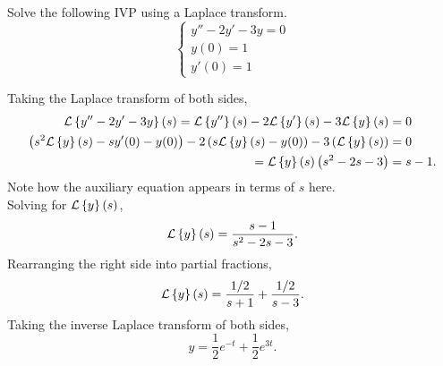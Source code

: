 \begin{example}
	Solve the following IVP using a Laplace transform.
	\begin{equation*}
		\begin{cases}
			y'' - 2y' - 3y = 0 \\
			y(0) = 1 \\
			y'(0) = 1
		\end{cases}
	\end{equation*}
\end{example}
\noindent
Taking the Laplace transform of both sides,
\begin{align*}
	\mathcal{L}\left\{ y'' - 2y' - 3y \right\}\left(s\right) = \mathcal{L}\left\{ y'' \right\}\left(s\right) - 2\mathcal{L}\left\{ y' \right\}\left(s\right) - 3\mathcal{L}\left\{ y \right\}\left(s\right) &= 0 \\
	\left(s^2\mathcal{L}\left\{ y \right\}\left(s\right) - sy'(0) - y(0)\right) - 2\left(s\mathcal{L}\left\{ y \right\}\left(s\right) - y(0)\right) - 3\left(\mathcal{L}\left\{ y \right\}\left(s\right)\right) &= 0 \\
	= \mathcal{L}\left\{ y \right\}\left(s\right)\left(s^2 - 2s - 3\right) &= s - 1.
\end{align*}
Note how the auxiliary equation appears in terms of $s$ here.\\
Solving for $\mathcal{L}\left\{ y \right\}\left(s\right)$,
\begin{equation*}
	\mathcal{L}\left\{ y \right\}\left(s\right) = \frac{s - 1}{s^2 - 2s - 3}.
\end{equation*}
Rearranging the right side into partial fractions,
\begin{equation*}
	\mathcal{L}\left\{ y \right\}\left(s\right) = \frac{1/2}{s+1} + \frac{1/2}{s-3}.
\end{equation*}
Taking the inverse Laplace transform of both sides,
\begin{equation*}
	y = \frac{1}{2}e^{-t} + \frac{1}{2}e^{3t}.
\end{equation*}

